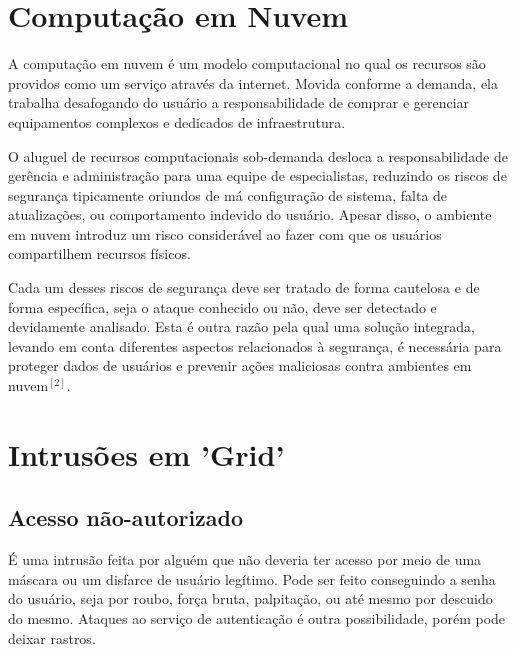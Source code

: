 \documentclass[journal]{IEEEtran}
\begin{document}
\section{Computação em Nuvem}
A computação em nuvem é um modelo computacional no qual os recursos são providos como um serviço através da internet. Movida conforme a demanda, ela trabalha desafogando do usuário a responsabilidade de comprar e gerenciar equipamentos complexos e dedicados de infraestrutura. \par
O aluguel de recursos computacionais sob-demanda desloca a responsabilidade de gerência e administração para uma equipe de especialistas, reduzindo os riscos de segurança tipicamente oriundos de má configuração de sistema, falta de atualizações, ou comportamento indevido do usuário. Apesar disso, o ambiente em nuvem introduz um risco considerável ao fazer com que os usuários compartilhem recursos físicos. \par
Cada um desses riscos de segurança deve ser tratado de forma cautelosa e de forma específica, seja o ataque conhecido ou não, deve ser detectado e devidamente analisado. Esta é outra razão pela qual uma solução integrada, levando em conta diferentes aspectos relacionados à segurança, é necessária para proteger dados de usuários e prevenir ações maliciosas contra ambientes em nuvem$^{ [2] }$.

\begin{comment}
Talvez falar um pouco mais sobre como são feitos esses ataque, quais são e como podem afetar um ambiente compartilhado de nuvem. Como um ataque a uma aplicação de um usuário pode sair do controle da máquina e expandir sua atuação para outras máquinas, quebrando a fronteira que limita os recursos de um só usuário.

Ataques podem ocorrer em diferentes camadas, em diferentes níveis. Como, por exemplo, em uma aplicação web, que roda como um 'Software as a Service', ou SaaS, pode ser alvo de ataques de aplicação com XSS, ou SQL injection. \par
Um exemplo de vulnerabilidade na camada de sistema seria 
\end{comment}

\section{Intrusões em 'Grid'}
\subsection{Acesso não-autorizado}
É uma intrusão feita por alguém que não deveria ter acesso por meio de uma máscara ou um disfarce de usuário legítimo. Pode ser feito conseguindo a senha do usuário, seja por roubo, força bruta, palpitação, ou até mesmo por descuido do mesmo. Ataques ao serviço de autenticação é outra possibilidade, porém pode deixar rastros.
\end{document}
